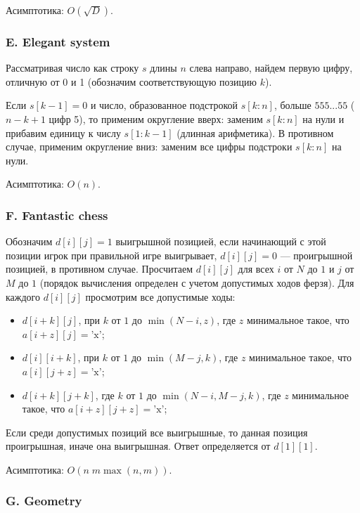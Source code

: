 Асимптотика: $O(\sqrt{D})$.



\subsubsection*{E. Elegant system} 


Рассматривая число как строку $s$ длины $n$ слева направо, найдем первую цифру, отличную от 0 и 1 (обозначим соответствующую позицию $k$). 

Если $s[k-1] = 0$ и число, образованное подстрокой $s[k:n]$, больше $555...55$ ($n-k+1$ цифр 5), то применим округление вверх: заменим $s[k:n]$ на нули и прибавим единицу к числу $s[1:k-1]$ (длинная арифметика). В противном случае, применим округление вниз: заменим все цифры подстроки $s[k:n]$ на нули.

Асимптотика: $O(n)$.



\subsubsection*{F. Fantastic chess}


Обозначим $d[i][j] = 1$ выигрышной позицией, если начинающий с этой позиции игрок при правильной игре выигрывает, $d[i][j] = 0$ --- проигрышной позицией, в противном случае. Просчитаем $d[i][j]$ для всех $i$ от $N$ до $1$ и $j$ от $M$ до $1$ (порядок вычисления определен с учетом допустимых ходов ферзя). Для каждого $d[i][j]$ просмотрим все допустимые ходы:
\begin{itemize}
\item $d[i+k][j]$, при $k$ от $1$ до $\min(N-i, z)$, где $z$ минимальное такое, что $a[i+z][j] = \text{'x'}$;
\item $d[i][i+k]$, при $k$ от $1$ до $\min(M-j, k)$, где $z$ минимальное такое, что $a[i][j+z] = \text{'x'}$;
\item $d[i+k][j+k]$, где $k$ от $1$ до $\min(N-i, M-j, k)$, где $z$ минимальное такое, что $a[i+z][j+z] = \text{'x'}$;
\end{itemize} 
Если среди допустимых позиций все выигрышные, то данная позиция проигрышная, иначе она выигрышная. Ответ определяется от $d[1][1]$.

Асимптотика: $O(n \; m \max(n,m))$.



\subsubsection*{G. Geometry} 

